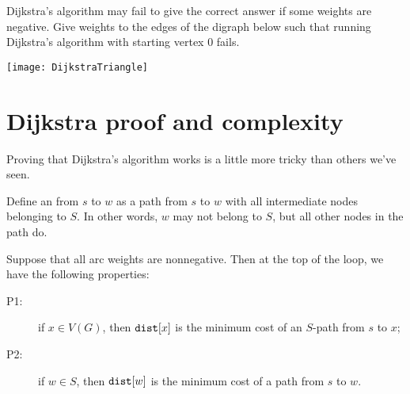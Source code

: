 \begin{Boxample}[0.5] \label{ex:dijk-neg-fails}
Dijkstra's algorithm may fail to give the correct answer if some weights are negative.
Give weights to the edges of the digraph below such that running Dijkstra's algorithm with starting vertex $0$
fails. 
\vspace{0.5cm} 
\begin{center}
\texttt{[image: DijkstraTriangle]}
\end{center}
\end{Boxample}

\chapter{Dijkstra proof and complexity} %

Proving that Dijkstra's algorithm works is a little more tricky than others we've seen.

Define an  from $s$ to $w$ as a
path from $s$ to $w$ with all intermediate nodes belonging to $S$. In other words, $w$ may not belong to $S$, but all other nodes in the path do.

\begin{Theorem}
\label{thm:dijkstra} Suppose that all arc weights are nonnegative. Then
at the top of the  loop, we have the following properties:
\begin{description}
\item[P1:] if $x\in V(G)$, then $\dist[x]$ is the minimum cost of an $S$-path 
from $s$ to $x$;
\item[P2:] if $w\in S$, then $\dist[w]$ is the minimum cost of a path
from $s$ to $w$.
\end{description}
\end{Theorem}

